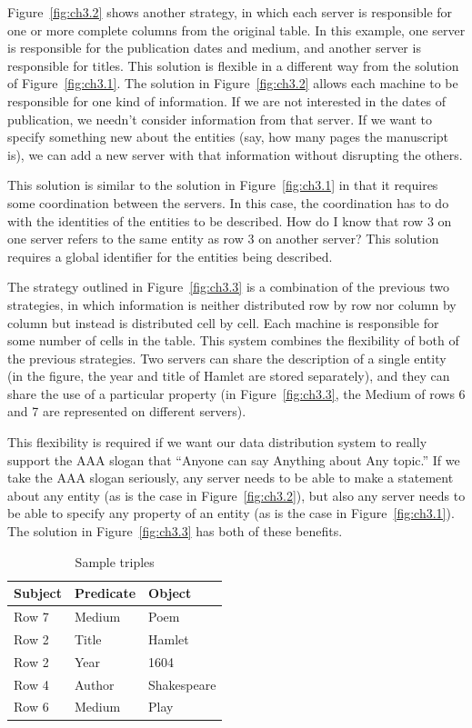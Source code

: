 Figure~\ref{fig:ch3.2} shows another strategy, in which each server is responsible
for one or more complete columns from the original table. In this
example, one server is responsible for the publication dates and medium,
and another server is responsible for titles. This solution is flexible
in a different way from the solution of Figure~\ref{fig:ch3.1}. The solution in
Figure~\ref{fig:ch3.2} allows each machine to be responsible for one kind of
information. If we are not interested in the dates of publication, we
needn't consider information from that server. If we want to specify
something new about the entities (say, how many pages the manuscript
is), we can add a new server with that information without disrupting
the others.

This solution is similar to the solution in Figure~\ref{fig:ch3.1} in that it
requires some coordination between the servers. In this case, the
coordination has to do with the identities of the entities to be
described. How do I know that row 3 on one server refers to the same
entity as row 3 on another server? This solution requires a global
identifier for the entities being described.

The strategy outlined in Figure~\ref{fig:ch3.3} is a combination of the previous two
strategies, in which information is neither distributed row by row nor
column by column but instead is distributed cell by cell. Each machine
is responsible for some number of cells in the table. This system
combines the flexibility of both of the previous strategies. Two servers
can share the description of a single entity (in the figure, the year
and title of Hamlet are stored separately), and they can share the use
of a particular property (in Figure~\ref{fig:ch3.3}, the Medium of rows 6 and 7 are
represented on different servers).

This flexibility is required if we want our data distribution system to
really support the AAA slogan that ``Anyone can say Anything about Any topic.'' If we take the AAA
slogan seriously, any server needs to be able to make a statement about
any entity (as is the case in Figure~\ref{fig:ch3.2}), but also any server needs to
be able to specify any property of an entity (as is the case in Figure~\ref{fig:ch3.1}). The solution in Figure~\ref{fig:ch3.3} has both of these benefits.


\begin{table}[h]
\centering
\begin{tabular}{||l l l||} 
 \hline
Subject&Predicate&Object \\ [0.5ex] 
 \hline\hline
Row 7&Medium&Poem \\
Row 2&Title&Hamlet \\
Row 2&Year&1604\\
Row 4&Author&Shakespeare\\
Row 6&Medium&Play\\

\hline
\end{tabular}
\caption{Sample triples}
\label{tab:ch3.2}
\end{table}





